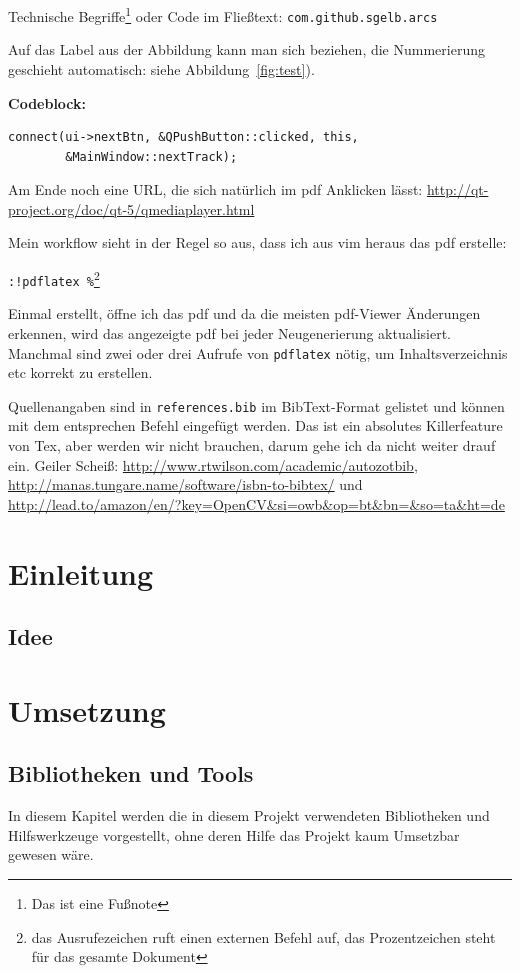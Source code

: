 Technische Begriffe\footnote{Das ist eine Fußnote} oder Code im Fließtext:
\texttt{com.github.sgelb.arcs}

Auf das Label aus der Abbildung kann man sich beziehen, die Nummerierung
geschieht automatisch: siehe Abbildung~\ref{fig:test}).


\textbf{Codeblock:}

\begin{lstlisting}
connect(ui->nextBtn, &QPushButton::clicked, this,
        &MainWindow::nextTrack);
\end{lstlisting}

Am Ende noch eine URL, die sich natürlich im pdf Anklicken lässt:
\url{http://qt-project.org/doc/qt-5/qmediaplayer.html}

Mein workflow sieht in der Regel so aus, dass ich aus vim heraus das pdf
erstelle:

\texttt{:!pdflatex \%}\footnote{das Ausrufezeichen ruft einen
externen Befehl auf, das Prozentzeichen steht für das gesamte Dokument}

Einmal erstellt, öffne ich das pdf und da die meisten pdf-Viewer Änderungen
erkennen, wird das angezeigte pdf bei jeder Neugenerierung aktualisiert.
Manchmal sind zwei oder drei Aufrufe von \texttt{pdflatex} nötig, um
Inhaltsverzeichnis etc korrekt zu erstellen.

Quellenangaben sind in \texttt{references.bib} im BibText-Format
\citep{wiki:bibtex} gelistet und können mit dem entsprechen Befehl eingefügt
werden. Das ist ein absolutes Killerfeature von Tex, aber werden wir nicht
brauchen, darum gehe ich da nicht weiter drauf ein. Geiler Scheiß:
\url{http://www.rtwilson.com/academic/autozotbib},
\url{http://manas.tungare.name/software/isbn-to-bibtex/} und
\url{http://lead.to/amazon/en/?key=OpenCV&si=owb&op=bt&bn=&so=ta&ht=de}




\section{Einleitung}  %
\subsection{Idee}  %

\section{Umsetzung}  %
\subsection{Bibliotheken und Tools}  %
In diesem Kapitel werden die in diesem Projekt verwendeten Bibliotheken und Hilfswerkzeuge
vorgestellt, ohne deren Hilfe das Projekt kaum Umsetzbar gewesen wäre.
